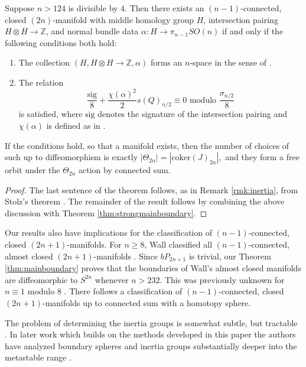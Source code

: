 \begin{thm} \label{thm:classification}
Suppose $n>124$ is divisible by $4$.  Then there exists an $(n-1)$-connected, closed $(2n)$-manifold with middle homology group $H$, intersection pairing $H \otimes H \to \mathbb{Z}$, and normal bundle data $\alpha:H \to \pi_{n-1}SO(n)$ if and only if the following conditions both hold:
\begin{enumerate}
\item The collection $(H, H \otimes H \to \mathbb{Z},\alpha)$ forms an $n$-space in the sense of .
\item The relation 
$$\frac{\mathrm{sig}}{8}+\frac{\chi(\alpha)^2}{2}s(Q)_{n/2} \equiv 0 \text{ modulo } \frac{\sigma_{n/2}}{8}$$
 is satisfied, where $\mathrm{sig}$ denotes the signature of the intersection pairing and $\chi(\alpha)$ is defined as in .
\end{enumerate}
If the conditions hold, so that a manifold exists, then the number of choices of such up to diffeomorphism is exactly $|\Theta_{2n}| = |\mathrm{coker}(J)_{2n}|,$ and they form a free orbit under the $\Theta_{2n}$ action by connected sum.
\end{thm}

\begin{proof}
The last sentence of the theorem follows, as in Remark \ref{rmk:inertia}, from Stolz's theorem \cite[Theorem D]{StolzBook}.  The remainder of the result follows by combining the above discussion with Theorem \ref{thm:strongmainboundary}.
\end{proof}


\begin{rmk}
  Our results also have implications for the classification of $(n-1)$-connected, closed $(2n+1)$-manifolds.  For $n \ge 8$, Wall classified all $(n-1)$-connected, almost closed $(2n+1)$-manifolds \cite{Wall67}.  Since $bP_{2n+1}$ is trivial, our Theorem \ref{thm:mainboundary} proves that the boundaries of Wall's almost closed manifolds are diffeomorphic to $S^{2n}$ whenever $n>232$.  This was previously unknown for $n \equiv 1$ modulo $8$ \cite[Theorem B]{StolzBook}.  There follows a classification of $(n-1)$-connected, closed $(2n+1)$-manifolds up to connected sum with a homotopy sphere.

  The problem of determining the inertia groups is somewhat subtle,
  but tractable \cite[Theorem D]{StolzBook}.
  In later work which builds on the methods developed in this paper the authors have analyzed boundary spheres and inertia groups substantially deeper into the metastable range \cite{burklund2020inertia}.
\end{rmk}


